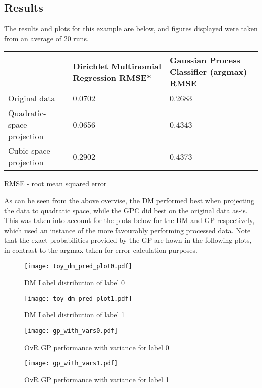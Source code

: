 \subsection{Results}

The results and plots for this example are below, and figures displayed were taken from an average of $20$ runs.

\begin{table}[H]
    \label{table:toy_gm_vs_gp}
    \begin{tabular}{|C{4cm}|C{4cm}|C{6cm}|}
        \hline
        & Dirichlet Multinomial Regression RMSE* & Gaussian Process Classifier (argmax) RMSE \\\hline
        Original data & 0.0702 & 0.2683\\\hline
        Quadratic-space projection & 0.0656 & 0.4343\\\hline
        Cubic-space projection & 0.2902 & 0.4373 \\\hline
    \end{tabular}
    \begingroup
    \tiny{RMSE - root mean squared error}
    \endgroup
\end{table}

As can be seen from the above overvise, the DM performed best when projecting the data to quadratic space, while the GPC did best on the original data as-is. This was taken into account for the plots below for the DM and GP respectively, which used an instance of the more favourably performing processed data. Note that the exact probabilities provided by the GP are hown in the following plots, in contrast to the argmax taken for error-calculation purposes. 

\begin{figure}[H]
    \texttt{[image: toy\_dm\_pred\_plot0.pdf]}
    \caption{DM Label distribution of label 0}
    \label{fig:toylabel0}
\end{figure}
\begin{figure}[H]
    \texttt{[image: toy\_dm\_pred\_plot1.pdf]}
    \caption{DM Label distribution of label 1}
    \label{fig:toylabel1}
\end{figure} 

\begin{figure}[H]
    \texttt{[image: gp\_with\_vars0.pdf]}
    \caption{OvR GP performance with variance for label 0}
    \label{fig:toylabel0}
\end{figure}
\begin{figure}[H]
    \texttt{[image: gp\_with\_vars1.pdf]}
    \caption{OvR GP performance with variance for label 1}
    \label{fig:toylabel1}
\end{figure} 

